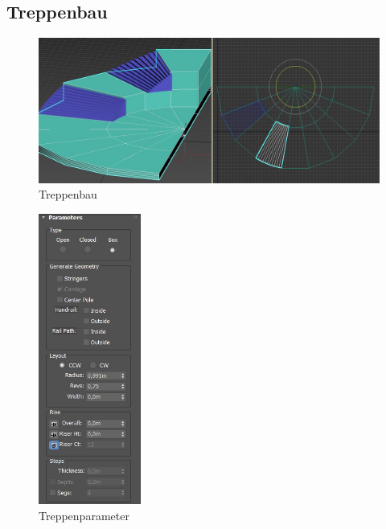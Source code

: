 \newpage
\subsection{Treppenbau}

\begin{figure}[h]
	\centering
	\includegraphics[width=0.95 \linewidth]{Abbildungen/3dsMax/Treppe_final}
	\caption{Treppenbau}
	\label{fig:Treppe}
\end{figure}

\begin{figure}
	\begin{center}
		\includegraphics[width=0.3\textwidth]{Abbildungen/3dsMax/Treppe3}
	\end{center}
	\caption{Treppenparameter}
	\label{fig:Parameter}
\end{figure}

